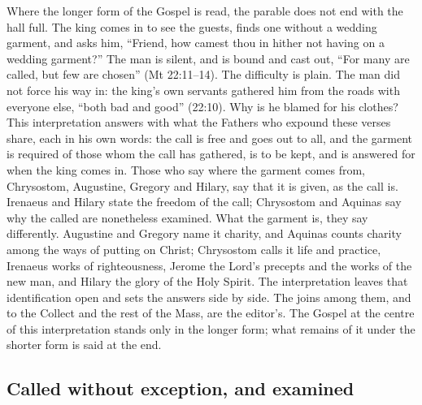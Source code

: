 \label{sec:the-wedding-garment}

Where the longer form of the Gospel is read, the parable does not end with the
hall full. The king comes in to see the guests, finds one without a wedding
garment, and asks him, ``Friend, how camest thou in hither not having on a
wedding garment?'' The man is silent, and is bound and cast out, ``For many
are called, but few are chosen'' (Mt 22:11--14). The difficulty is plain. The
man did not force his way in: the king's own servants gathered him from the
roads with everyone else, ``both bad and good'' (22:10). Why is he blamed for
his clothes? This interpretation answers with what the Fathers who expound
these verses share, each in his own words: the call is free and goes out to
all, and the garment is required of those whom the call has gathered, is to be
kept, and is answered for when the king comes in. Those who say where the
garment comes from, Chrysostom, Augustine, Gregory and Hilary, say that it is
given, as the call is. Irenaeus and Hilary state the freedom of the call;
Chrysostom and Aquinas say why the called are nonetheless examined. What the
garment is, they say differently. Augustine and Gregory name it charity, and
Aquinas counts charity among the ways of putting on Christ; Chrysostom calls
it life and practice, Irenaeus works of righteousness, Jerome the Lord's
precepts and the works of the new man, and Hilary the glory of the Holy
Spirit. The interpretation leaves that identification open and sets the
answers side by side. The
joins among them, and to the Collect and the rest of the Mass, are the
editor's. The Gospel at the centre of this interpretation stands only in the
longer form; what remains of it under the shorter form is said at the end.

\subsection{Called without exception, and examined}

